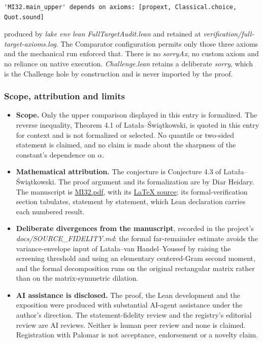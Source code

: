 \documentclass[11pt,a4paper]{article}
\providecommand{\tightlist}{\setlength{\itemsep}{0pt}\setlength{\parskip}{0pt}}
\begin{document}
\begin{verbatim}
'MI32.main_upper' depends on axioms: [propext, Classical.choice, Quot.sound]
\end{verbatim}

produced by \textit{lake env lean FullTargetAudit.lean} and retained
at \textit{verification/full-target-axioms.log}. The Comparator
configuration permits only those three axioms and the mechanical run
enforced that. There is no \textit{sorryAx}, no custom axiom and no
reliance on native execution. \textit{Challenge.lean} retains a
deliberate \textit{sorry}, which is the Challenge hole by construction
and is never imported by the proof.

\subsubsection{Scope, attribution and
limits}\label{scope-attribution-and-limits}

\begin{itemize}
\tightlist
\item
  \textbf{Scope.} Only the upper comparison displayed in this entry is
  formalized. The reverse inequality, Theorem 4.1 of
  Latała--Świątkowski, is quoted in this entry for context and is not
  formalized or selected. No quantile or two-sided statement is claimed,
  and no claim is made about the sharpness of the constant's dependence
  on \(\alpha\).
\item
  \textbf{Mathematical attribution.} The conjecture is Conjecture 4.3 of
  Latała--Świątkowski. The proof argument and its formalization are by
  Diar Heidary. The manuscript is
  \href{https://github.com/DiarHaidary/Spectral-norms-of-independent-entries-with-regular-moment-growth/blob/bd00df8dca9c6128cf528591d3485f8ca9eecd88/docs/manuscript/MI32.pdf}{MI32.pdf},
  with its
  \href{https://github.com/DiarHaidary/Spectral-norms-of-independent-entries-with-regular-moment-growth/blob/bd00df8dca9c6128cf528591d3485f8ca9eecd88/docs/manuscript/MI32.tex}{LaTeX
  source}; its formal-verification section tabulates, statement by
  statement, which Lean declaration carries each numbered result.
\item
  \textbf{Deliberate divergences from the manuscript}, recorded in the
  project's \textit{docs/SOURCE\_FIDELITY.md}: the formal far-remainder
  estimate avoids the variance-envelope input of Latała--van
  Handel--Youssef by raising the screening threshold and using an
  elementary centered-Gram second moment, and the formal decomposition
  runs on the original rectangular matrix rather than on the
  matrix-symmetric dilation.
\item
  \textbf{AI assistance is disclosed.} The proof, the Lean development
  and the exposition were produced with substantial AI-agent assistance
  under the author's direction. The statement-fidelity review and the
  registry's editorial review are AI reviews. Neither is human peer
  review and none is claimed. Registration with Palomar is not
  acceptance, endorsement or a novelty claim.
\end{itemize}
\end{document}

